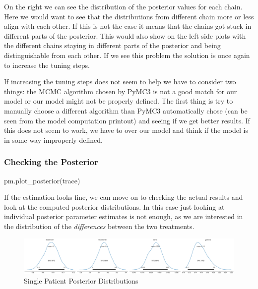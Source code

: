 \documentclass[12pt,a4paper,leqno]{report}
\theoremstyle{plain}
\theoremstyle{definition}
\theoremstyle{remark}
\begin{document}
On the right we can see the distribution of the posterior values for each chain. Here we
would want to see that the distributions from different chain more or less align with
each other. If this is not the case it means that the chains got stuck in different
parts of the posterior. This would also show on the left side plots with the different
chains staying in different parts of the posterior and being distinguishable from each
other. If we see this problem the solution is once again to increase the tuning steps.




If increasing the tuning steps does not seem to help we have to consider two things: the
MCMC algorithm chosen by PyMC3 is not a good match for our model or our model might not
be properly defined. The first thing is try to manually choose a different algorithm than
PyMC3 automatically chose (can be seen from the model computation printout) and seeing
if we get better results. If this does not seem to work, we have to over our model and
think if the model is in some way improperly defined.


\bigskip
\subsubsection{Checking the Posterior}
\begin{pyverbatim}
pm.plot_posterior(trace)
\end{pyverbatim}
\bigskip

If the estimation looks fine, we can move on to checking the actual results and look at
the computed posterior distributions. In this case just looking at individual
posterior parameter estimates is not enough, as we are interested in the distribution of
the \emph{differences} between the two treatments.


\begin{figure}[!h]
    \caption{Single Patient Posterior Distributions}
    \includegraphics[width=\textwidth,height=\textheight,keepaspectratio]{single_patient_posteriors.pdf}
\end{figure}
\end{document}
